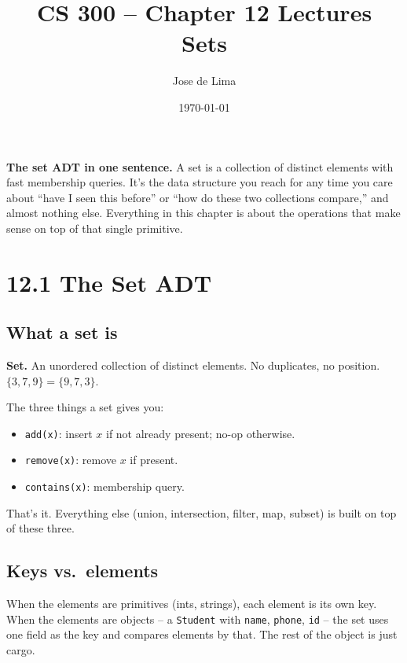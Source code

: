 \documentclass[11pt]{article}
\title{CS 300 -- Chapter 12 Lectures\\\large Sets}
\author{Jose de Lima}
\date{\today}
\begin{document}
\maketitle

\begin{ideabox}
\textbf{The set ADT in one sentence.} A set is a collection of distinct elements with fast membership queries. It's the data structure you reach for any time you care about ``have I seen this before'' or ``how do these two collections compare,'' and almost nothing else. Everything in this chapter is about the operations that make sense on top of that single primitive.
\end{ideabox}

\section{12.1 The Set ADT}

\subsection*{What a set is}

\begin{defnbox}
\textbf{Set.} An unordered collection of distinct elements. No duplicates, no position. $\{3, 7, 9\} = \{9, 7, 3\}$.
\end{defnbox}

The three things a set gives you:
\begin{itemize}[leftmargin=*]
    \item \texttt{add(x)}: insert $x$ if not already present; no-op otherwise.
    \item \texttt{remove(x)}: remove $x$ if present.
    \item \texttt{contains(x)}: membership query.
\end{itemize}

That's it. Everything else (union, intersection, filter, map, subset) is built on top of these three.

\subsection*{Keys vs.\ elements}

When the elements are primitives (ints, strings), each element is its own key. When the elements are objects -- a \texttt{Student} with \texttt{name}, \texttt{phone}, \texttt{id} -- the set uses one field as the key and compares elements by that. The rest of the object is just cargo.
\end{document}
